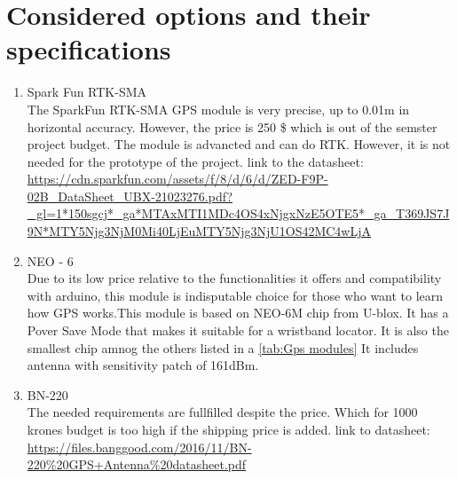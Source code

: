 \documentclass{article}[10pt]
\begin{document}
\section{Considered options and their specifications}
\begin{enumerate}
    \item Spark Fun RTK-SMA\\
    The SparkFun RTK-SMA GPS module is very precise, up to 0.01m in horizontal accuracy. However,
    the price is 250 \$ which is out of the semster project budget. The module is advancted and can do RTK. 
    However, it is not needed for the prototype of the project.
    link to the datasheet: \url{https://cdn.sparkfun.com/assets/f/8/d/6/d/ZED-F9P-02B_DataSheet_UBX-21023276.pdf?_gl=1*150sgcj*_ga*MTAxMTI1MDc4OS4xNjgxNzE5OTE5*_ga_T369JS7J9N*MTY5Njg3NjM0Mi40LjEuMTY5Njg3NjU1OS42MC4wLjA}
       
    \item NEO - 6\\
    Due to its low price relative to the functionalities it offers and compatibility with arduino, 
    this module is indisputable choice for those who want to learn how GPS works.This module is based on NEO-6M chip from U-blox. 
    It has a Pover Save Mode that makes it suitable for a wristband locator. It is also the smallest chip amnog the others listed in a  \autoref{tab:Gps modules}
    It includes antenna with sensitivity patch of 161dBm.
    \item BN-220\\
    The needed requirements are fullfilled despite the price. Which for 1000 krones budget is too high if the shipping price is added.
link to datasheet: \url{https://files.banggood.com/2016/11/BN-220%20GPS+Antenna%20datasheet.pdf}

\end{enumerate}
\end{document}
